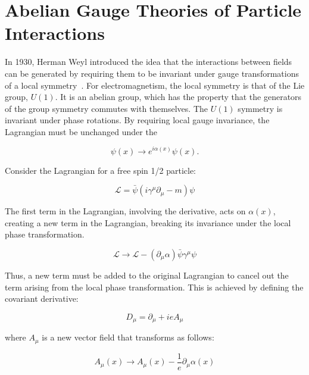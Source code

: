\section{Abelian Gauge Theories of Particle Interactions}
\label{abelian_gauge_theory_overview}

\par In 1930, Herman Weyl introduced the idea that the interactions
between fields can be generated by requiring them to be invariant
under gauge transformations of a local symmetry~\cite{Weyl}.  For
electromagnetism, the local symmetry is that of the Lie group,
$U(1)$.  It is an abelian group, which has the property that the
generators of the group symmetry commutes with themselves. 
The $U(1)$ symmetry is invariant under phase rotations.  By requiring
local gauge invariance, the Lagrangian must be unchanged under the 

\begin{equation}\label{eq:u1_psi_transformation}
\psi(x) \rightarrow e^{i\alpha(x)}\psi(x).
\end{equation}

Consider the Lagrangian for a free spin 1/2 particle: 

\begin{equation}\label{eq:dirac_lagrangian}
\mathcal{L} = \bar{\psi}(i\gamma^{\mu}\partial_{\mu} - m)\psi
\end{equation}

\noindent The first term in the Lagrangian, involving the derivative,
acts on $\alpha(x)$, creating a new term in the Lagrangian, breaking
its invariance under the local phase transformation.  

\begin{equation}\label{eq:u1_lagrangian_transformation}
\mathcal{L}\rightarrow\mathcal{L} -
(\partial_{\mu}\alpha)\bar{\psi}\gamma^{\mu}\psi
\end{equation}

\noindent Thus, a new term must be added to the original Lagrangian to cancel
out the term arising from the local phase transformation.  This is
achieved by defining the covariant derivative:

\begin{equation}\label{eq:covariant_derivative_em}
D_{\mu} = \partial_{\mu} + ieA_{\mu}
\end{equation} 

\noindent where $A_{\mu}$ is a new vector field that transforms as follows:

\begin{equation}\label{eq:u1_Afield_transformation}
A_{\mu}(x) \rightarrow A_{\mu}(x) - \frac{1}{e}\partial_{\mu}\alpha(x)
\end{equation}

